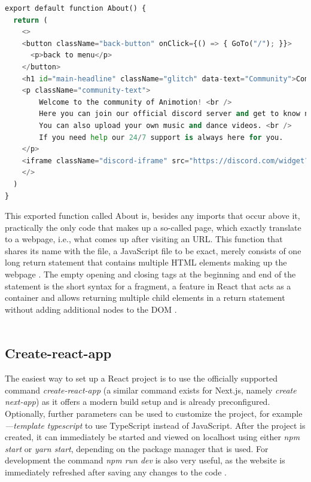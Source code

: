 \begin{lstlisting}[language=Python,caption=Example of a react component,label=lst:react]
  export default function About() {
  return (
    <>
    <button className="back-button" onClick={() => { GoTo("/"); }}>
      <p>back to menu</p>
    </button>
    <h1 id="main-headline" className="glitch" data-text="Community">Community</h1>
    <p className="community-text">
        Welcome to the community of Animotion! <br />
        Here you can join our official discord server and get to know new people. <br />
        You can also upload your own music and dance videos. <br />
        If you need help our 24/7 support is always here for you.
    </p>
    <iframe className="discord-iframe" src="https://discord.com/widget?id=1035647726634934382&theme=dark" allowtransparency="true" frameBorder="0" sandbox="allow-popups allow-popups-to-escape-sandbox allow-same-origin allow-scripts"></iframe>
    </>
  )
}
\end{lstlisting}

This exported function called About is, besides any imports that occur above it, practically the only code that makes 
up a so-called page, which exactly translate to a webpage, i.e., what comes up after visiting an URL. This function 
that shares its name with the file, a JavaScript file to be exact, merely consists of one long return statement that 
contains multiple HTML elements making up the webpage \cite{ReactJSX}.
The empty opening and closing tags at the beginning and end of the statement is the short syntax for a fragment, a 
feature in React that acts as a container and allows returning multiple child elements in a return statement 
without adding additional nodes to the DOM \cite{ReactFragments}.
\\
\\
\subsection{Create-react-app}
The easiest way to set up a React project is to use the officially supported command \emph{create-react-app}
(a similar command exists for Next.js, namely \emph{create next-app}) as it offers a modern build setup and is already preconfigured. 
Optionally, further parameters can be used to customize the project, for example \emph{—template typescript} to use TypeScript 
instead of JavaScript. After the project is created, it can immediately be started and viewed on localhost using either 
\emph{npm start} or \emph{yarn start}, depending on the package manager that is used. For development the command \emph{npm run dev} is 
also very useful, as the website is immediately refreshed after saving any changes to the code \cite{create-react}.
\\
\\
